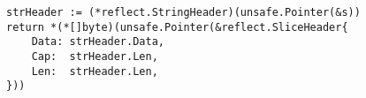 \begin{lstlisting}[language=Golang, label=lst:cast-1-statement, caption=Unsafe slice cast in one single statement]
strHeader := (*reflect.StringHeader)(unsafe.Pointer(&s))
return *(*[]byte)(unsafe.Pointer(&reflect.SliceHeader{
    Data: strHeader.Data,
    Cap:  strHeader.Len,
    Len:  strHeader.Len,
}))
\end{lstlisting}